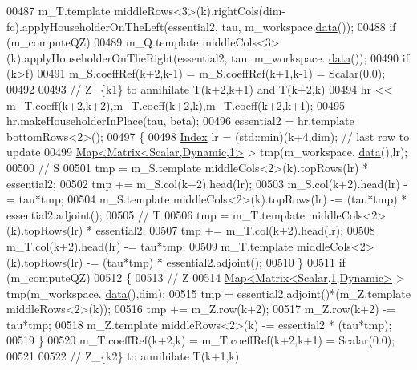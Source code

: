 \begin{DoxyCode}
00487         m\_T.template middleRows<3>(k).rightCols(dim-fc).applyHouseholderOnTheLeft(essential2, tau, 
      m\_workspace.\hyperlink{class_eigen_1_1_plain_object_base_ac25699535374b1854cf8494e44ad31b2}{data}());
00488         \textcolor{keywordflow}{if} (m\_computeQZ)
00489           m\_Q.template middleCols<3>(k).applyHouseholderOnTheRight(essential2, tau, m\_workspace.
      \hyperlink{class_eigen_1_1_plain_object_base_ac25699535374b1854cf8494e44ad31b2}{data}());
00490         \textcolor{keywordflow}{if} (k>f)
00491           m\_S.coeffRef(k+2,k-1) = m\_S.coeffRef(k+1,k-1) = Scalar(0.0);
00492 
00493         \textcolor{comment}{// Z\_\{k1\} to annihilate T(k+2,k+1) and T(k+2,k)}
00494         hr << m\_T.coeff(k+2,k+2),m\_T.coeff(k+2,k),m\_T.coeff(k+2,k+1);
00495         hr.makeHouseholderInPlace(tau, beta);
00496         essential2 = hr.template bottomRows<2>();
00497         \{
00498           \hyperlink{group___eigenvalues___module_a6201e534e901b5f4e66f72c176b534a3}{Index} lr = (std::min)(k+4,dim); \textcolor{comment}{// last row to update}
00499           \hyperlink{group___core___module_class_eigen_1_1_map}{Map<Matrix<Scalar,Dynamic,1>} > tmp(m\_workspace.
      \hyperlink{class_eigen_1_1_plain_object_base_ac25699535374b1854cf8494e44ad31b2}{data}(),lr);
00500           \textcolor{comment}{// S}
00501           tmp = m\_S.template middleCols<2>(k).topRows(lr) * essential2;
00502           tmp += m\_S.col(k+2).head(lr);
00503           m\_S.col(k+2).head(lr) -= tau*tmp;
00504           m\_S.template middleCols<2>(k).topRows(lr) -= (tau*tmp) * essential2.adjoint();
00505           \textcolor{comment}{// T}
00506           tmp = m\_T.template middleCols<2>(k).topRows(lr) * essential2;
00507           tmp += m\_T.col(k+2).head(lr);
00508           m\_T.col(k+2).head(lr) -= tau*tmp;
00509           m\_T.template middleCols<2>(k).topRows(lr) -= (tau*tmp) * essential2.adjoint();
00510         \}
00511         \textcolor{keywordflow}{if} (m\_computeQZ)
00512         \{
00513           \textcolor{comment}{// Z}
00514           \hyperlink{group___core___module_class_eigen_1_1_map}{Map<Matrix<Scalar,1,Dynamic>} > tmp(m\_workspace.
      \hyperlink{class_eigen_1_1_plain_object_base_ac25699535374b1854cf8494e44ad31b2}{data}(),dim);
00515           tmp = essential2.adjoint()*(m\_Z.template middleRows<2>(k));
00516           tmp += m\_Z.row(k+2);
00517           m\_Z.row(k+2) -= tau*tmp;
00518           m\_Z.template middleRows<2>(k) -= essential2 * (tau*tmp);
00519         \}
00520         m\_T.coeffRef(k+2,k) = m\_T.coeffRef(k+2,k+1) = Scalar(0.0);
00521 
00522         \textcolor{comment}{// Z\_\{k2\} to annihilate T(k+1,k)}

\end{DoxyCode}
